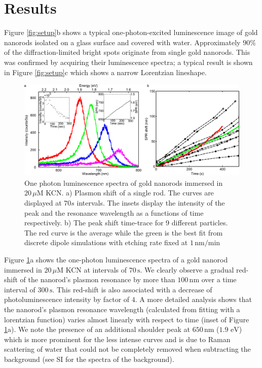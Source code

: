 \documentclass[a4paper,oneside,onecolumn]{article}
\newcommand{\nm}{\ensuremath{\,\textrm{nm}}}
\newcommand{\eV}{\ensuremath{\,\textrm{eV}}}
\newcommand{\uM}{\ensuremath{\,\mu\textrm{M}}}
\begin{document}
\section{Results}

Figure \ref{fig:setup}b shows a typical one-photon-excited luminescence image
of gold nanorods isolated on a glass surface and covered with water.
Approximately $90\%$ of the diffraction-limited bright spots originate from
single gold nanorods. This was confirmed by acquiring their luminescence
spectra; a typical result is shown in Figure \ref{fig:setup}c which shows
a narrow Lorentzian lineshape\cite{Funston2009}.

\begin{figure}[p]
 \centering
 \includegraphics[width=0.95\linewidth]{Figures/02_Experimental/Experimental.png}
 \caption{One photon luminescence spectra of gold nanorods immersed in $20\uM$
 KCN. a) Plasmon shift of a single rod. The curves are displayed at $70s$
 intervals. The insets display the intensity of the peak and the resonance
 wavelength as a functions of time respectively. b) The peak shift time-trace
 for 9 different particles. The red curve is the average while the green is the
 best fit from discrete dipole simulations with etching rate fixed at
 $1\nm/\textrm{min}$}
 \label{fig:plasmon_single_rod}
\end{figure}

Figure \ref{fig:plasmon_single_rod}a shows the one-photon luminescence spectra
of a gold nanorod immersed in $20\uM$ KCN at intervals of $70\,\text{s}$. We
clearly observe a gradual red-shift of the nanorod's plasmon resonance by more
than  $100\nm$ over a time interval of $300\,\text{s}$. This red-shift is also
associated with a decrease of photoluminescence intensity by factor of $4$. A
more detailed analysis shows that the nanorod's plasmon resonance wavelength
(calculated from fitting with a lorentzian function) varies almost linearly
with respect to time (inset of Figure \ref{fig:plasmon_single_rod}a). We note
the presence of an additional shoulder peak at $650\nm$ ($1.9\,\eV$) which is
more prominent for the less intense curves and is due to Raman scattering of
water\cite{Snow1985} that could not be completely removed when subtracting the
background (see SI for the spectra of the background).
\end{document}
